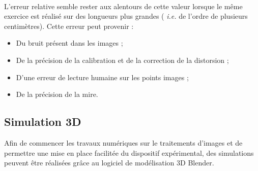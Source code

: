 \documentclass[a4paper, 11pt]{article}
\begin{document}
			\\L'erreur relative semble rester aux alentours de cette valeur lorsque le même exercice est réalisé sur des longueurs plus grandes ( \textit{i.e.} de l'ordre de plusieurs centimètres). Cette erreur peut provenir :
			\begin{itemize}[label=$\rightarrow$]
				\item Du bruit présent dans les images ;
				\item De la précision de la calibration et de la correction de la distorsion ;
				\item D'une erreur de lecture humaine sur les points images ;
				\item De la précision de la mire.
			\end{itemize}
			
	
	\subsection{Simulation 3D}
		Afin de commencer les travaux numériques sur le traitements d'images et de permettre une mise en place facilitée du dispositif expérimental, des simulations peuvent être réalisées grâce au logiciel de modélisation 3D Blender.
\end{document}
